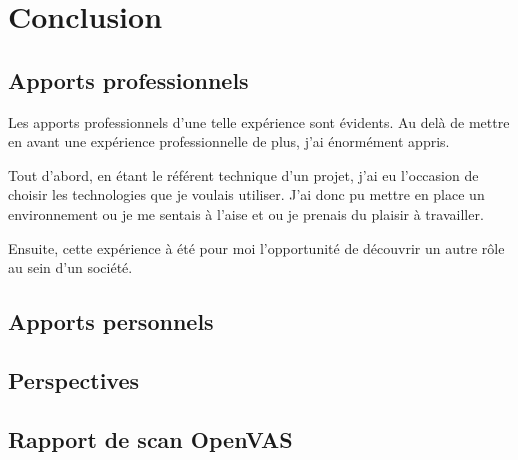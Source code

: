 \documentclass[]{report}
\begin{document}

\chapter{Conclusion}

  \section{Apports professionnels}

    Les apports professionnels d'une telle expérience sont évidents. Au delà de mettre en avant une expérience professionnelle de plus, j'ai énormément appris.

    Tout d'abord, en étant le référent technique d'un projet, j'ai eu l'occasion de choisir les technologies que je voulais utiliser. J'ai donc pu mettre en place un environnement ou je me sentais à l'aise et ou je prenais du plaisir à travailler.

    Ensuite, cette expérience à été pour moi l'opportunité de découvrir un autre rôle au sein d'un société.


  \section{Apports personnels}


  \section{Perspectives}



    \begin{appendix}
        \chapter{Rapport de scan OpenVAS}
        \label{openvas_report}
        
    \end{appendix}
\end{document}
